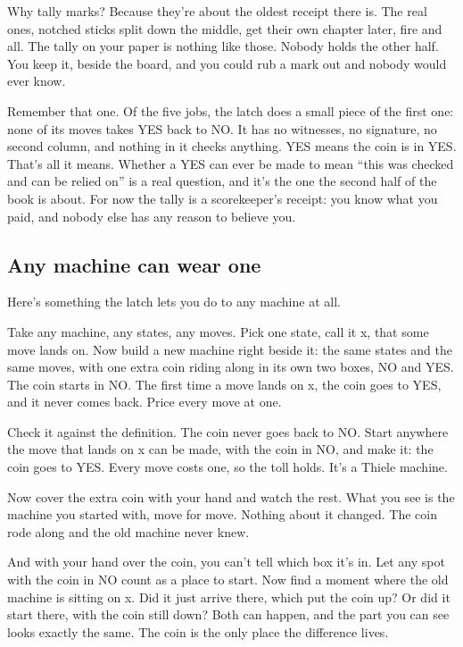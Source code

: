 \documentclass[11pt,twoside]{article}
\theoremstyle{thielethm}
\theoremstyle{thieledef}
\theoremstyle{thieledef}
\theoremstyle{thieledef}
\theoremstyle{thielethm}
\theoremstyle{thieleobs}
\theoremstyle{thielethm}
\begin{document}
Why tally marks? Because they're about the oldest receipt there is. The real ones, notched sticks split down the middle, get their own chapter later, fire and all. The tally on your paper is nothing like those. Nobody holds the other half. You keep it, beside the board, and you could rub a mark out and nobody would ever know.

Remember that one. Of the five jobs, the latch does a small piece of the first one: none of its moves takes YES back to NO. It has no witnesses, no signature, no second column, and nothing in it checks anything. YES means the coin is in YES. That's all it means. Whether a YES can ever be made to mean ``this was checked and can be relied on'' is a real question, and it's the one the second half of the book is about. For now the tally is a scorekeeper's receipt: you know what you paid, and nobody else has any reason to believe you.

\subsection{Any machine can wear one}

Here's something the latch lets you do to any machine at all.

Take any machine, any states, any moves. Pick one state, call it x, that some move lands on. Now build a new machine right beside it: the same states and the same moves, with one extra coin riding along in its own two boxes, NO and YES. The coin starts in NO. The first time a move lands on x, the coin goes to YES, and it never comes back. Price every move at one.

Check it against the definition. The coin never goes back to NO. Start anywhere the move that lands on x can be made, with the coin in NO, and make it: the coin goes to YES. Every move costs one, so the toll holds. It's a Thiele machine.

Now cover the extra coin with your hand and watch the rest. What you see is the machine you started with, move for move. Nothing about it changed. The coin rode along and the old machine never knew.

And with your hand over the coin, you can't tell which box it's in. Let any spot with the coin in NO count as a place to start. Now find a moment where the old machine is sitting on x. Did it just arrive there, which put the coin up? Or did it start there, with the coin still down? Both can happen, and the part you can see looks exactly the same. The coin is the only place the difference lives.
\end{document}
